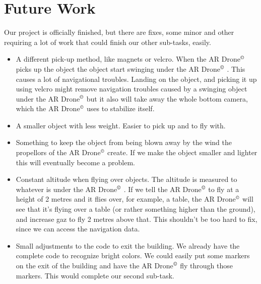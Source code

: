 \documentclass[a4paper,10pt]{article}
\newcommand{\Ardrone}{AR Drone$^{\copyright}$ }
\begin{document}
\section{Future Work}
Our project is officially finished, but there are fixes, some minor and other requiring a lot of work that could finish our other sub-tasks, easily. 
\begin{itemize}
    \item A different pick-up method, like magnets or velcro. When the \Ardrone picks up the object the object start swinging under the \Ardrone. This causes a lot of
navigational troubles. Landing on the object, and picking it up using velcro might remove navigation troubles caused by a swinging object under the \Ardrone but it 
also will take away the whole bottom camera, which the \Ardrone uses to stabilize itself.
    \item A smaller object with less weight. Easier to pick up and to fly with. 
    \item Something to keep the object from being blown away by the wind the
    propellors of the \Ardrone create. If we make the object smaller and lighter
    this will eventually
become a problem.
    \item Constant altitude when flying over objects. The altitude is measured to whatever is under the \Ardrone. If we tell the \Ardrone to fly at a height of 2 metres
and it flies over, for example, a table, the \Ardrone will see that it's flying over a table (or rather something higher than the ground), and increase gaz to fly 2 metres above
that. This shouldn't be too hard to fix, since we can access the navigation
data. 
    \item Small adjustments to the code to exit the building. We already have the complete code to recognize bright colors. We could easily put some markers on the
exit of the building and have the \Ardrone fly through those markers. This would complete our second sub-task.
\end{itemize}
\end{document}
